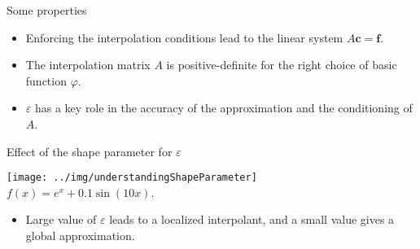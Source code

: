 \documentclass{beamer}
\begin{document}
\begin{frame}{Some properties}
  \begin{itemize}
    \item Enforcing the interpolation conditions lead to the linear system 
      $A\mathbf{c} = \mathbf{f}$.
      
    \item The interpolation matrix $A$ is positive-definite for the right choice
      of basic function $\varphi$.

    \item $\varepsilon$ has a key role in the accuracy of the approximation and
      the conditioning of $A$.
  \end{itemize}
\end{frame}

\begin{frame}{Effect of the shape parameter for $\varepsilon$}
  \begin{center}
    \texttt{[image: ../img/understandingShapeParameter]}\\
    $f(x) = e^x + 0.1\sin(10x)$.
  \end{center}

  \begin{itemize}
    \item Large value of $\varepsilon$ leads to a localized interpolant, and a
      small value gives a global approximation.
  \end{itemize}
\end{frame}
\end{document}
